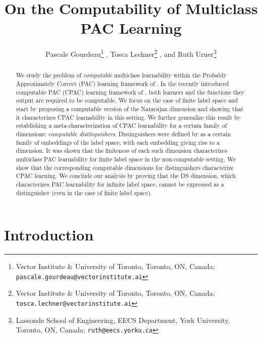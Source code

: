 \documentclass[11pt]{article}
\title{On the Computability of Multiclass PAC Learning}
\author{Pascale Gourdeau\thanks{Vector Institute \& University of Toronto, Toronto, ON, Canada; \texttt{pascale.gourdeau@vectorinstitute.ai}} ,  Tosca Lechner\thanks{Vector Institute \& University of Toronto, Toronto, ON, Canada; \texttt{tosca.lechner@vectorinstitute.ai}} ,  and Ruth Urner\thanks{Lassonde School of Engineering, EECS Department, York University, Toronto, ON, Canada; \texttt{ruth@eecs.yorku.ca}}}
\date{\vspace{-5ex}}
\begin{document}
\maketitle

\begin{abstract}%
    We study the problem of \emph{computable} multiclass learnability within the Probably Approximately Correct (PAC) learning framework of \cite{valiant1984theory}.
    In the recently introduced computable PAC (CPAC) learning framework of \cite{agarwal2020learnability}, both learners and the functions they output are required to be computable.
    We focus on the case of finite label space and start by proposing a computable version of the Natarajan dimension and showing that it characterizes CPAC learnability in this setting.
    We further generalize this result by establishing a meta-characterization of CPAC learnability for a certain family of dimensions: \emph{computable distinguishers}.
    Distinguishers were defined by \cite{ben1992characterizations} as a certain family of embeddings of the label space, with each embedding giving rise to a dimension. It was shown that the finiteness of each such dimension characterizes multiclass PAC learnability for finite label space in the non-computable setting. We show that the corresponding computable dimensions for distinguishers characterize CPAC learning.
    We conclude our analysis by proving that the DS dimension, which characterizes PAC learnability for infinite label space, cannot be expressed as a distinguisher (even in the case of finite label space).
\end{abstract}

\section{Introduction}
\end{document}
